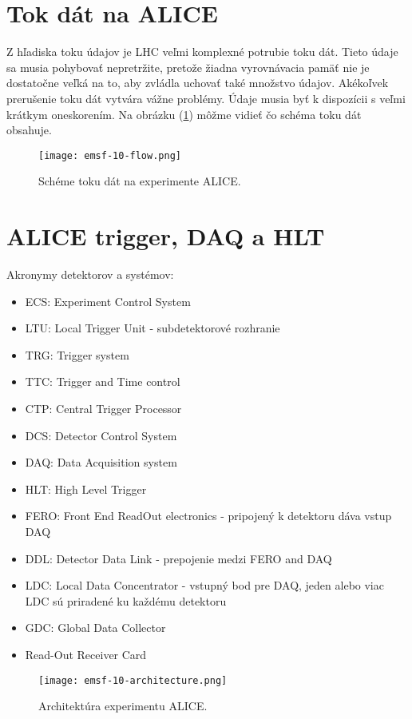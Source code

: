 \documentclass[../../main.tex]{subfiles}
\begin{document}
\section{Tok dát na ALICE}
Z hľadiska toku údajov je LHC veľmi komplexné potrubie toku dát. Tieto údaje sa musia pohybovať nepretržite, pretože žiadna vyrovnávacia pamäť nie je dostatočne veľká na to, aby zvládla uchovať také množstvo údajov. Akékoľvek prerušenie toku dát vytvára vážne problémy. Údaje musia byť k dispozícii s veľmi krátkym oneskorením. Na obrázku (\ref{em10:fig:flow}) môžme vidieť čo schéma toku dát obsahuje.

\begin{figure}[!h]
\texttt{[image: emsf-10-flow.png]}
\centering
\caption{Schéme toku dát na experimente ALICE.}
\label{em10:fig:flow}
\end{figure}

\section{ALICE trigger, DAQ a HLT}
Akronymy detektorov a systémov: 
\begin{itemize}
\item ECS: Experiment Control System
\item LTU: Local Trigger Unit - subdetektorové rozhranie
\item TRG: Trigger system
\item TTC: Trigger and Time control
\item CTP: Central Trigger Processor
\item DCS: Detector Control System
\item DAQ: Data Acquisition system
\item HLT: High Level Trigger
\item FERO: Front End ReadOut electronics - pripojený k detektoru dáva vstup DAQ
\item DDL: Detector Data Link - prepojenie medzi FERO and DAQ
\item LDC: Local Data Concentrator - vstupný bod pre DAQ, jeden alebo viac LDC sú priradené ku každému detektoru
\item GDC: Global Data Collector
\item Read-Out Receiver Card
\end{itemize}

\begin{figure}[h!]
\texttt{[image: emsf-10-architecture.png]}
\centering
\caption{Architektúra experimentu ALICE.}
\label{em10:fig:architecture}
\end{figure}
\end{document}
